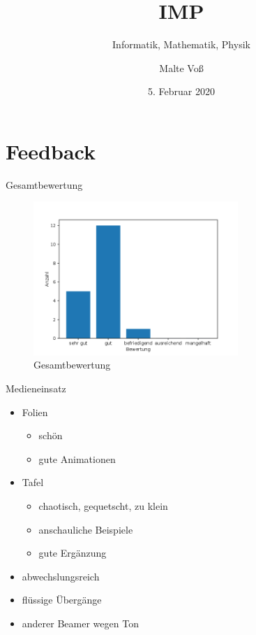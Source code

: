 \documentclass[18pt]{beamer}
\title[IMP]{IMP}
\subtitle{Informatik, Mathematik, Physik}
\author{Malte Vo\ss}
\institute{Abteilung für Didaktik der Mathematik}
\date{5. Februar 2020}
\begin{document}

\begin{frame}
\titlepage
\end{frame}

\section*{Feedback}

\begin{frame}{Gesamtbewertung}
    \begin{figure}[]
        \centering
        \includegraphics[keepaspectratio,width=0.69\textwidth]{figures/noten.png}
        \caption{Gesamtbewertung}
    \end{figure}
\end{frame}

\begin{frame}{Medieneinsatz}
    \begin{itemize}[<+->]
        \item Folien
        \begin{itemize}
            \item schön
            \item gute Animationen
        \end{itemize}
        \item Tafel 
        \begin{itemize}
            \item chaotisch, gequetscht, zu klein
            \item anschauliche Beispiele
            \item gute Ergänzung
        \end{itemize}
        \item abwechslungsreich
        \item flüssige Übergänge
        \item anderer Beamer wegen Ton
    \end{itemize}
\end{frame}
\end{document}
